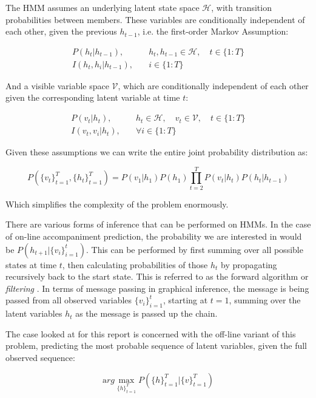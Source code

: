\documentclass[bsc,singlespacing,logo, parskip, deptreport]{infthesis}
\begin{document}
The HMM assumes an underlying latent state space $\mathcal H$, with transition probabilities between members. These variables are conditionally independent of each other, given the previous $h_{t-1}$, i.e. the first-order Markov Assumption:

\begin{align}
  P(h_t | h_{t-1}),& \quad h_t, h_{t-1} \in {\mathcal H}, \quad  t \in \{1:T\} \\
  I(h_t, h_i | h_{t-1}),&  \quad i \in \{1:T\}
\end{align}

And a visible variable space $\mathcal V$, which are conditionally independent of each other given the corresponding latent variable at time $t$:

\begin{align}
  P(v_t | h_t),& \quad h_t \in {\mathcal H}, \quad v_t \in {\mathcal V}, \quad  t \in \{1:T\} \\
  I(v_t, v_i | h_{t}),& \quad \forall i \in \{1:T\}
\end{align}

Given these assumptions we can write the entire joint probability distribution as:

\begin{equation}
  P(\{v_{t}\}^{T}_{t=1}, \{h_{t}\}^{T}_{t=1}) = P(v_1 | h_1) P(h_1) \prod_{t=2}^{T} P(v_t | h_t) P(h_t | h_{t-1})
\end{equation}

Which simplifies the complexity of the problem enormously.

There are various forms of inference that can be performed on HMMs. In the case of on-line accompaniment prediction, the probability we are interested in would be $P(h_{t+1} | \{v_i\}_{i=1}^{t})$. This can be performed by first summing over all possible states at time $t$, then calculating probabilities of those $h_t$ by propagating recursively back to the start state. This is referred to as the forward algorithm or {\em filtering} \cite{russell2002artificial}. In terms of message passing in graphical inference, the message is being passed from all observed variables $\{v_i\}_{i=1}^{t}$, starting at $t=1$, summing over the latent variables $h_t$ as the message is passed up the chain.

The case looked at for this report is concerned with the off-line variant of this problem, predicting the most probable sequence of latent variables, given the full observed sequence:

\begin{equation}
  {\mathrm arg}\max_{\{h\}_{t=1}^{T}} P(\{h\}_{t=1}^{T} | \{v\}_{t=1}^{T})
\end{equation}
\end{document}
